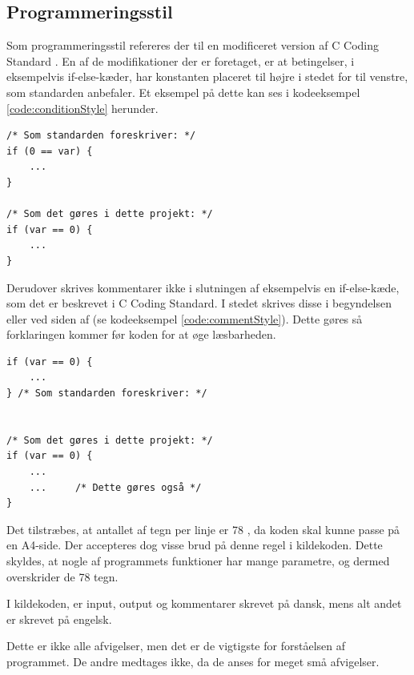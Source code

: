 \subsection{Programmeringsstil}
Som programmeringsstil refereres der til en modificeret version af C Coding Standard \cite{codingstyle}. En af de modifikationer der er foretaget, er at betingelser, i eksempelvis if-else-kæder, har konstanten placeret til højre i stedet for til venstre, som standarden anbefaler. Et eksempel på dette kan ses i kodeeksempel \ref{code:conditionStyle} herunder.

\begin{listing}[H]
\begin{verbatim}
/* Som standarden foreskriver: */
if (0 == var) {
    ...
}

/* Som det gøres i dette projekt: */
if (var == 0) {
    ...
}
\end{verbatim}
\captionsetup{name=Kodeeksempel}
\label{code:conditionStyle}
\end{listing}

\clearpage
Derudover skrives kommentarer ikke i slutningen af eksempelvis en if-else-kæde, som det er beskrevet i C Coding Standard. I stedet skrives disse i begyndelsen eller ved siden af (se kodeeksempel \ref{code:commentStyle}). Dette gøres så forklaringen kommer før koden for at øge læsbarheden.

\begin{listing}[H]
\begin{verbatim}
if (var == 0) {
    ...
} /* Som standarden foreskriver: */


/* Som det gøres i dette projekt: */
if (var == 0) {
    ...
    ...     /* Dette gøres også */
}
\end{verbatim}
\label{code:commentStyle}
\end{listing}

Det tilstræbes, at antallet af tegn per linje er 78 \cite{codingstyle}, da koden skal kunne passe på en A4-side. Der accepteres dog visse brud på denne regel i kildekoden. Dette skyldes, at nogle af programmets funktioner har mange parametre, og dermed overskrider de 78 tegn. 
\par
I kildekoden, er input, output og kommentarer skrevet på dansk, mens alt andet er skrevet på engelsk.
\par
Dette er ikke alle afvigelser, men det er de vigtigste for forståelsen af programmet. De andre medtages ikke, da de anses for meget små afvigelser.

